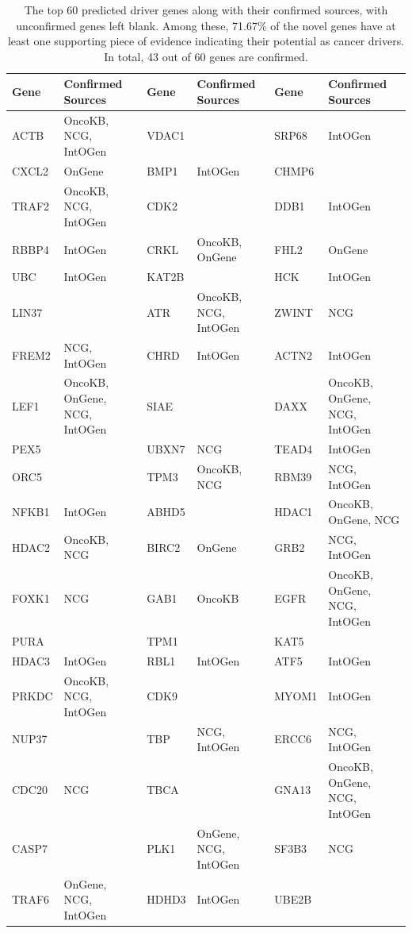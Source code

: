  	\begin{table}[h]
 	\centering
 	\begin{tabular}{llllll}
 		\toprule
 		\textbf{Gene} & \textbf{Confirmed Sources} & \textbf{Gene} & \textbf{Confirmed Sources} & \textbf{Gene} & \textbf{Confirmed Sources} \\
 		\midrule
 		ACTB & OncoKB, NCG, IntOGen & VDAC1 &  & SRP68 & IntOGen \\
 		CXCL2 & OnGene & BMP1 & IntOGen & CHMP6 &  \\
 		TRAF2 & OncoKB, NCG, IntOGen & CDK2 &  & DDB1 & IntOGen \\
 		RBBP4 & IntOGen & CRKL & OncoKB, OnGene & FHL2 & OnGene \\
 		UBC & IntOGen & KAT2B &  & HCK & IntOGen \\
 		LIN37 &  & ATR & OncoKB, NCG, IntOGen & ZWINT & NCG \\
 		FREM2 & NCG, IntOGen & CHRD & IntOGen & ACTN2 & IntOGen \\
 		LEF1 & OncoKB, OnGene, NCG, IntOGen & SIAE &  & DAXX & OncoKB, OnGene, NCG, IntOGen \\
 		PEX5 &  & UBXN7 & NCG & TEAD4 & IntOGen \\
 		ORC5 &  & TPM3 & OncoKB, NCG & RBM39 & NCG, IntOGen \\
 		NFKB1 & IntOGen & ABHD5 &  & HDAC1 & OncoKB, OnGene, NCG \\
 		HDAC2 & OncoKB, NCG & BIRC2 & OnGene & GRB2 & NCG, IntOGen \\
 		FOXK1 & NCG & GAB1 & OncoKB & EGFR & OncoKB, OnGene, NCG, IntOGen \\
 		PURA &  & TPM1 &  & KAT5 &  \\
 		HDAC3 & IntOGen & RBL1 & IntOGen & ATF5 & IntOGen \\
 		PRKDC & OncoKB, NCG, IntOGen & CDK9 &  & MYOM1 & IntOGen \\
 		NUP37 &  & TBP & NCG, IntOGen & ERCC6 & NCG, IntOGen \\
 		CDC20 & NCG & TBCA &  & GNA13 & OncoKB, OnGene, NCG, IntOGen \\
 		CASP7 &  & PLK1 & OnGene, NCG, IntOGen & SF3B3 & NCG \\
 		TRAF6 & OnGene, NCG, IntOGen & HDHD3 & IntOGen & UBE2B &  \\
 		\bottomrule
 	\end{tabular}
\caption{The top 60 predicted driver genes along with their confirmed sources, with unconfirmed genes left blank. Among these, 71.67\% of the novel genes have at least one supporting piece of evidence indicating their potential as cancer drivers. In total, 43 out of 60 genes are confirmed.}
 	\label{table:gene_sources}
 \end{table}
 
 